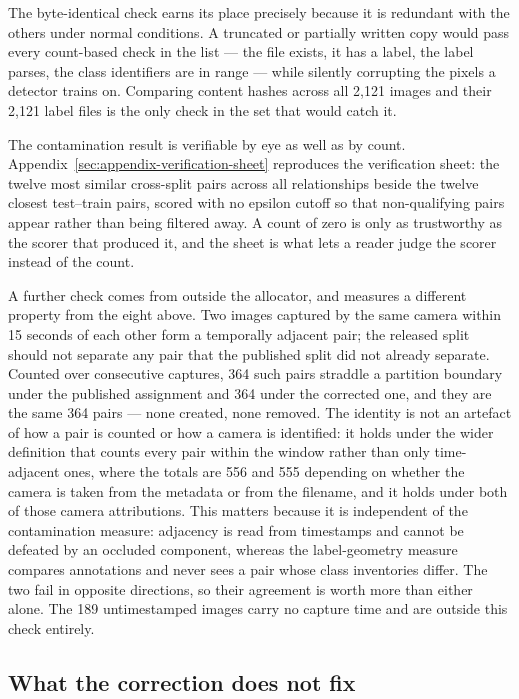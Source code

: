 The byte-identical check earns its place precisely because it is redundant with
the others under normal conditions. A truncated or partially written copy would
pass every count-based check in the list --- the file exists, it has a label, the
label parses, the class identifiers are in range --- while silently corrupting
the pixels a detector trains on. Comparing content hashes across all 2{,}121
images and their 2{,}121 label files is the only check in the set that would
catch it.

The contamination result is verifiable by eye as well as by count.
Appendix~\ref{sec:appendix-verification-sheet} reproduces the verification
sheet: the twelve most similar cross-split pairs across all relationships beside
the twelve closest test--train pairs, scored with no epsilon cutoff so that
non-qualifying pairs appear rather than being filtered away. A count of zero is
only as trustworthy as the scorer that produced it, and the sheet is what lets a
reader judge the scorer instead of the count.

A further check comes from outside the allocator, and measures a different
property from the eight above. Two images captured by the same camera within 15
seconds of each other form a temporally adjacent pair; the released split should
not separate any pair that the published split did not already separate. Counted
over consecutive captures, 364 such pairs straddle a partition boundary under the
published assignment and 364 under the corrected one, and they are the same 364
pairs --- none created, none removed. The identity is not an artefact of how a
pair is counted or how a camera is identified: it holds under the wider
definition that counts every pair within the window rather than only
time-adjacent ones, where the totals are 556 and 555 depending on whether the
camera is taken from the metadata or from the filename, and it holds under both
of those camera attributions. This matters because it is independent of the
contamination measure: adjacency is
read from timestamps and cannot be defeated by an occluded component, whereas the
label-geometry measure compares annotations and never sees a pair whose class
inventories differ. The two fail in opposite directions, so their agreement is
worth more than either alone. The 189 untimestamped images carry no capture time
and are outside this check entirely.



\subsection{What the correction does not fix}
\label{sec:correction-limits}

